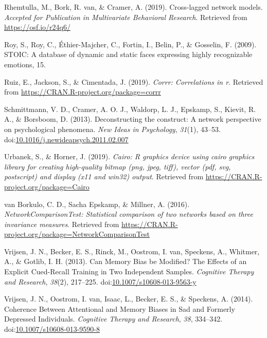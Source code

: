 \documentclass[man,floatsintext]{apa6}
\begin{document}
\leavevmode\hypertarget{ref-rhemtulla_cross-lagged_2019}{}%
Rhemtulla, M., Bork, R. van, \& Cramer, A. (2019). Cross-lagged network models. \emph{Accepted for Publication in Multivariate Behavioral Research}. Retrieved from \url{https://osf.io/r24q6/}

\leavevmode\hypertarget{ref-roy_stoic:_2009}{}%
Roy, S., Roy, C., Éthier-Majcher, C., Fortin, I., Belin, P., \& Gosselin, F. (2009). STOIC: A database of dynamic and static faces expressing highly recognizable emotions, 15.

\leavevmode\hypertarget{ref-R-corrr}{}%
Ruiz, E., Jackson, S., \& Cimentada, J. (2019). \emph{Corrr: Correlations in r}. Retrieved from \url{https://CRAN.R-project.org/package=corrr}

\leavevmode\hypertarget{ref-schmittmann_deconstructing_2013}{}%
Schmittmann, V. D., Cramer, A. O. J., Waldorp, L. J., Epskamp, S., Kievit, R. A., \& Borsboom, D. (2013). Deconstructing the construct: A network perspective on psychological phenomena. \emph{New Ideas in Psychology}, \emph{31}(1), 43--53. doi:\href{https://doi.org/10.1016/j.newideapsych.2011.02.007}{10.1016/j.newideapsych.2011.02.007}

\leavevmode\hypertarget{ref-R-Cairo}{}%
Urbanek, S., \& Horner, J. (2019). \emph{Cairo: R graphics device using cairo graphics library for creating high-quality bitmap (png, jpeg, tiff), vector (pdf, svg, postscript) and display (x11 and win32) output}. Retrieved from \url{https://CRAN.R-project.org/package=Cairo}

\leavevmode\hypertarget{ref-R-NetworkComparisonTest}{}%
van Borkulo, C. D., Sacha Epskamp, \& Millner, A. (2016). \emph{NetworkComparisonTest: Statistical comparison of two networks based on three invariance measures}. Retrieved from \url{https://CRAN.R-project.org/package=NetworkComparisonTest}

\leavevmode\hypertarget{ref-Vrijsen2013}{}%
Vrijsen, J. N., Becker, E. S., Rinck, M., Oostrom, I. van, Speckens, A., Whitmer, A., \& Gotlib, I. H. (2013). Can Memory Bias be Modified? The Effects of an Explicit Cued-Recall Training in Two Independent Samples. \emph{Cognitive Therapy and Research}, \emph{38}(2), 217--225. doi:\href{https://doi.org/10.1007/s10608-013-9563-y}{10.1007/s10608-013-9563-y}

\leavevmode\hypertarget{ref-Vrijsen2014}{}%
Vrijsen, J. N., Oostrom, I. van, Isaac, L., Becker, E. S., \& Speckens, A. (2014). Coherence Between Attentional and Memory Biases in Sad and Formerly Depressed Individuals. \emph{Cognitive Therapy and Research}, \emph{38}, 334--342. doi:\href{https://doi.org/10.1007/s10608-013-9590-8}{10.1007/s10608-013-9590-8}
\end{document}
